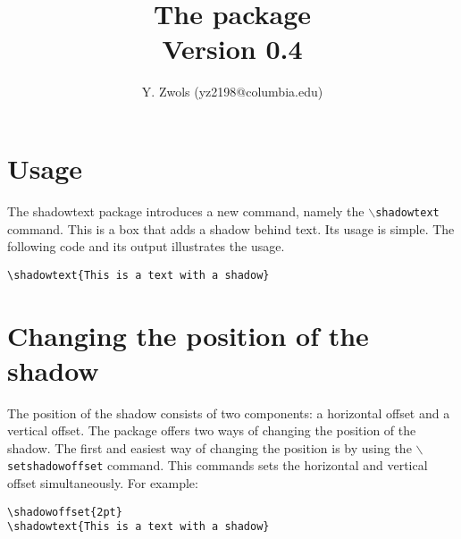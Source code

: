 \documentclass{article}
\begin{document}
\title{\bf The 
\shadowoffset{1.5pt}
package \\ \bigskip \normalfont\small Version 0.4}
\author{Y. Zwols (yz2198@columbia.edu)}
\maketitle

\shadowoffset{1pt}
\parindent=0pt
\parskip=8pt

\section{Usage}
The shadowtext package introduces a new command, namely the {\tt $\backslash$shadowtext} command. This is a box
that adds a shadow behind text. Its usage is simple. The following code and its output illustrates the usage. 

\begin{minipage}{\textwidth}
\begin{multicols*}{2} 
{\footnotesize
\begin{verbatim}
\shadowtext{This is a text with a shadow}
\end{verbatim}}

\end{multicols*}
\end{minipage}

\section{Changing the position of the shadow}
The position of the shadow consists of two components: a horizontal offset and a vertical offset. 
The package offers two ways of changing the position of the shadow. The first and easiest way of 
changing the position is by using the {\tt $\backslash$setshadowoffset} command. This commands
sets the horizontal and vertical offset simultaneously. For example:

\begin{minipage}{\textwidth}
\begin{multicols*}{2} 
{\footnotesize
\begin{verbatim}
\shadowoffset{2pt}
\shadowtext{This is a text with a shadow}
\end{verbatim}}

\shadowoffset{2pt}
\end{multicols*}
\end{minipage}
\end{document}
